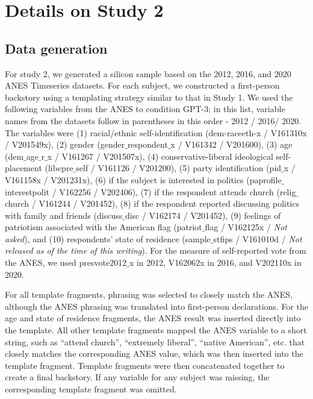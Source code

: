\documentclass[11pt]{article}
\begin{document}

\section{Details on Study 2}

\subsection{Data generation}

For study 2, we generated a silicon sample based on the 2012, 2016, and 2020 ANES Timeseries datasets.  For each subject, we constructed a first-person backstory using a templating strategy similar to that in Study 1.  We used the following variables from the ANES to condition GPT-3; in this list, variable names from the datasets follow in parentheses in this order - 2012 / 2016/ 2020. The variables were (1) racial/ethnic self-identification (dem-raceeth-x / V161310x / V201549x), (2) gender (gender$\_$respondent$\_$x / V161342 / V201600), (3) age (dem$\_$age$\_$r$\_$x / V161267 / V201507x), (4) conservative-liberal ideological self-placement (libcpre$\_$self / V161126 / V201200), (5) party identification (pid$\_$x / V161158x / V201231x), (6) if the subject is interested in politics (paprofile$\_$interestpolit / V162256 / V202406), (7) if the respondent attends church (relig$\_$church / V161244 / V201452), (8) if the respondent reported discussing politics with family and friends (discuss$\_$disc / V162174 / V201452), (9) feelings of patriotism associated with the American flag (patriot$\_$flag / V162125x / \textit{Not asked}), and (10) respondents' state of residence (sample$\_$stfips / V161010d / \textit{Not released as of the time of this writing}). For the measure of self-reported vote from the ANES, we used presvote2012$\_$x in 2012, V162062x in 2016, and V202110x in 2020.

For all template fragments, phrasing was selected to closely match the ANES, although the ANES phrasing was translated into first-person declarations.  For the age and state of residence fragments, the ANES result was inserted directly into the template.  All other template fragments mapped the ANES variable to a short string, such as ``attend church'', ``extremely liberal'', ``native American'', etc. that closely matches the corresponding ANES value, which was then inserted into the template fragment.  Template fragments were then concatenated together to create a final backstory. If any variable for any subject was missing, the corresponding template fragment was omitted.
\end{document}
